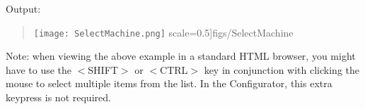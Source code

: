 \begin{itemize}
Output: 

\begin{quote}
\texttt{[image: SelectMachine.png]}
  scale=0.5]{figs/SelectMachine}
\end{quote}
Note: when viewing the above example in a standard HTML browser, you
might have to use the $<$SHIFT$>$ or $<$CTRL$>$ key in conjunction with clicking
the mouse to select multiple items from the list. In the Configurator,
this extra keypress is not required.\end{itemize}

